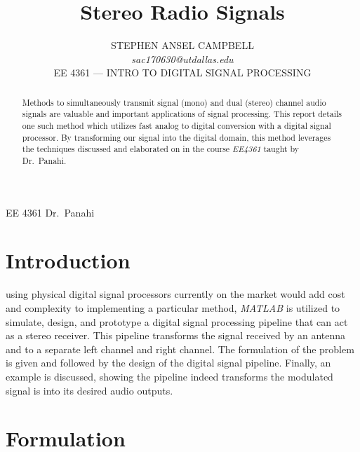 \documentclass[journal]{IEEEtran}
\begin{document}
\title{Stereo Radio Signals}

\author{STEPHEN ANSEL CAMPBELL \\
    \emph{sac170630@utdallas.edu} \\
    EE 4361 --- INTRO TO DIGITAL SIGNAL PROCESSING
}

{EE 4361 Dr.\ Panahi}

\maketitle

\begin{abstract}
    Methods to simultaneously transmit signal (mono) and dual (stereo) channel
    audio signals are valuable and important applications of signal processing.
    This report details one such method which utilizes fast analog to digital
    conversion with a digital signal processor.  By transforming our signal into
    the digital domain, this method leverages the techniques discussed and
    elaborated on in the course \emph{EE4361}  taught by Dr.\ Panahi.
\end{abstract}

\section{Introduction}

 using physical digital signal processors currently on
the market would add cost and complexity to implementing a particular method,
\emph{MATLAB} is utilized to simulate, design, and prototype a digital signal
processing pipeline that can act as a stereo receiver. This pipeline transforms
the signal received by an antenna and to a separate left channel and right
channel. The formulation of the problem is given and followed by the design of
the digital signal pipeline. Finally, an example is discussed, showing  the pipeline
indeed transforms the modulated signal is into its desired audio outputs.

\section{Formulation}
\end{document}
